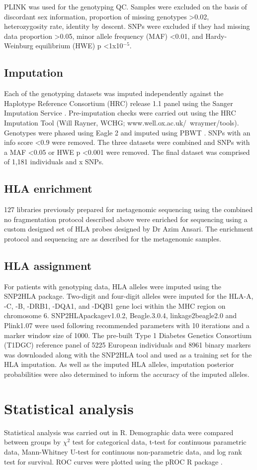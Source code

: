 PLINK was used for the genotyping QC. Samples were excluded on the basis of discordant sex information, proportion of missing genotypes \textgreater 0.02, heterozygosity rate, identity by descent. SNPs were excluded if they had missing data proportion \textgreater 0.05, minor allele frequency (MAF) \textless 0.01, and Hardy-Weinburg equilibrium (HWE) p \textless 1x10$^{-5}$.

\subsection{Imputation}
Each of the genotyping datasets was imputed independently against the Haplotype Reference Consortium (HRC) release 1.1 panel using the Sanger Imputation Service \parencite{McCarthy2016}. Pre-imputation checks were carried out using the HRC Imputation Tool (Will Rayner, WCHG; www.well.ox.ac.uk/~wraymer/tools). Genotypes were phased using Eagle 2 \parencite{Loh2016} and imputed using PBWT \parencite{Durbin2014}. SNPs with an info score \textless 0.9 were removed. The three datasets were combined and SNPs with a MAF \textless 0.05 or HWE p \textless 0.001 were removed. The final dataset was comprised of 1,181 individuals and x SNPs.

\subsection{HLA enrichment}
127 libraries previously prepared for metagenomic sequencing using the combined no fragmentation protocol described above were enriched for sequencing using a custom designed set of HLA probes designed by Dr Azim Ansari. The enrichment protocol and sequencing are as described for the metagenomic samples.

\subsection{HLA assignment}
For patients with genotyping data, HLA alleles were imputed using the SNP2HLA package. Two-digit and four-digit alleles were imputed for the HLA-A, -C, -B, -DRB1, -DQA1, and -DQB1 gene loci within the MHC region on chromosome 6. SNP2HLApackagev1.0.2, Beagle.3.0.4, linkage2beagle2.0 and Plink1.07  were used following recommended parameters with 10 iterations and a marker window size of 1000. The pre-built Type 1 Diabetes Genetics Consortium (T1DGC) reference panel of 5225 European individuals and 8961 binary markers was downloaded along with the SNP2HLA tool and used as a training set for the HLA imputation. As well as the imputed HLA alleles, imputation posterior probabilities were also determined to inform the accuracy of the imputed alleles.

\section{Statistical analysis}
Statistical analysis was carried out in R. Demographic data were compared between groups by $\chi^2$ test for categorical data, t-test for continuous parametric data, Mann-Whitney U-test for continuous non-parametric data, and log rank test for survival. ROC curves were plotted using the pROC R package \parencite{Robin2011}. 